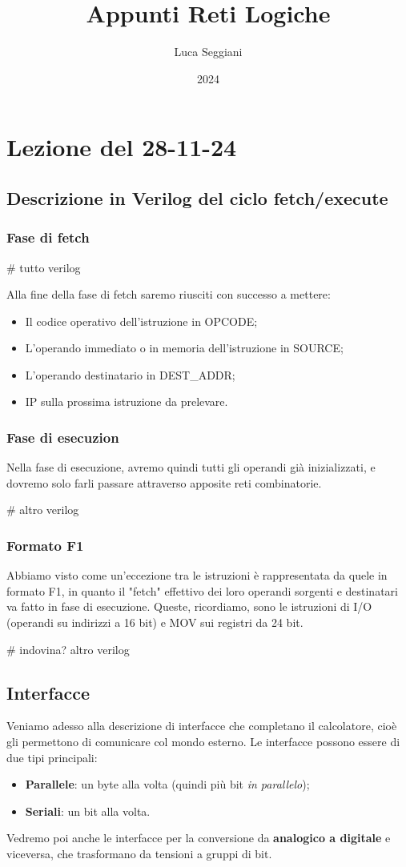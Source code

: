 \documentclass[a4paper,11pt]{article}
\title{Appunti Reti Logiche}
\author{Luca Seggiani}
\date{2024}
\begin{document}
\section{Lezione del 28-11-24}

\thispagestyle{empty}
\pagestyle{fancy}

\subsection{Descrizione in Verilog del ciclo fetch/execute}
\subsubsection{Fase di fetch} 

# tutto verilog

Alla fine della fase di fetch saremo riusciti con successo a mettere:
\begin{itemize}
	\item Il codice operativo dell'istruzione in OPCODE;
	\item L'operando immediato o in memoria dell'istruzione in SOURCE;
	\item L'operando destinatario in DEST\_ADDR;
	\item IP sulla prossima istruzione da prelevare.
\end{itemize}

\subsubsection{Fase di esecuzion}
Nella fase di esecuzione, avremo quindi tutti gli operandi già inizializzati, e dovremo solo farli passare attraverso apposite reti combinatorie.

# altro verilog

\subsubsection{Formato F1}
Abbiamo visto come un'eccezione tra le istruzioni è rappresentata da quele in formato F1, in quanto il "fetch" effettivo dei loro operandi sorgenti e destinatari va fatto in fase di esecuzione.
Queste, ricordiamo, sono le istruzioni di I/O (operandi su indirizzi a 16 bit) e MOV sui registri da 24 bit.

# indovina? altro verilog

\subsection{Interfacce}
Veniamo adesso alla descrizione di interfacce che completano il calcolatore, cioè gli permettono di comunicare col mondo esterno.
Le interfacce possono essere di due tipi principali:
\begin{itemize}
	\item \textbf{Parallele}: un byte alla volta (quindi più bit \textit{in parallelo});
	\item \textbf{Seriali}: un bit alla volta.
\end{itemize}
Vedremo poi anche le interfacce per la conversione da \textbf{analogico a digitale} e viceversa, che trasformano da tensioni a gruppi di bit.
\end{document}
